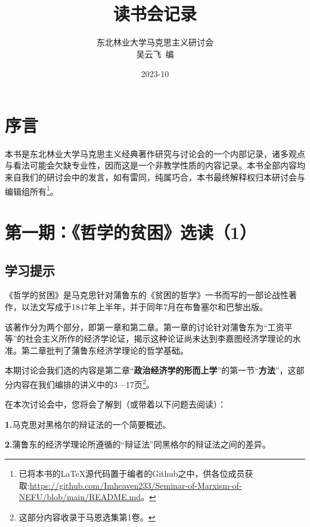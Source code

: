 \documentclass[a4paper,twoside,12pt,AutoFakeBold]{ctexart}
\title{读书会记录}
\author{东北林业大学马克思主义研讨会\\
 吴云飞~编}
\date{2023-10}
\begin{document}
\maketitle
\newpage



\tableofcontents%

\newpage

\section{序言}

\begin{adjustwidth}{2em}{2em}
\qquad\fangsong 
本书是东北林业大学马克思主义经典著作研究与讨论会的一个内部记录，诸多观点与看法可能会欠缺专业性，因而这是一个非教学性质的内容记录。本书全部内容均来自我们的研讨会中的发言，如有雷同，纯属巧合，本书最终解释权归本研讨会与编辑组所有\footnote{已将本书的\LaTeX{}源代码置于编者的Github之中，供各位成员获取:\url{https://github.com/Imheaven233/Seminar-of-Marxism-of-NEFU/blob/main/README.md}。}。

\end{adjustwidth}




\newpage

\section{第一期：《哲学的贫困》选读（1）}

\subsection{学习提示}

《哲学的贫困》是马克思针对蒲鲁东的《贫困的哲学》一书而写的一部论战性著作，以法文写成于1847年上半年，并于同年7月在布鲁塞尔和巴黎出版。

该著作分为两个部分，即第一章和第二章。第一章的讨论针对蒲鲁东为“工资平等”的社会主义所作的经济学论证，揭示这种论证尚未达到李嘉图经济学理论的水准。第二章批判了蒲鲁东经济学理论的哲学基础。

本期讨论会我们选的内容是第二章“\textbf{政治经济学的形而上学}”的第一节“\textbf{方法}”，这部分内容在我们编排的讲义中的3—17页\footnote{这部分内容收录于马恩选集第1卷。}。

在本次讨论会中，您将会了解到（或带着以下问题去阅读）：

\textbf{1.}马克思对黑格尔的辩证法的一个简要概述。

\textbf{2.}蒲鲁东的经济学理论所遵循的“辩证法”同黑格尔的辩证法之间的差异。
\end{document}
